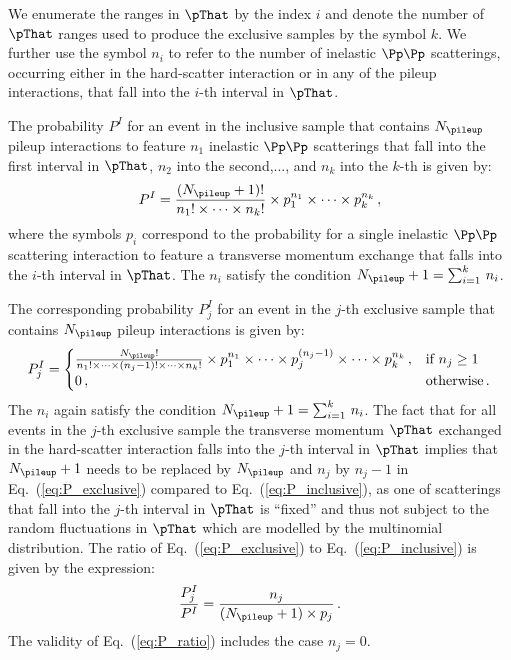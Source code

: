 We enumerate the ranges in $\pThat$ by the index $i$ and denote the number of $\pThat$ ranges used to produce the exclusive samples by the symbol $k$.
We further use the symbol $n_{i}$ to refer to the number of inelastic $\Pp\Pp$ scatterings,
occurring either in the hard-scatter interaction or in any of the pileup interactions,
that fall into the $i$-th interval in $\pThat$.

The probability $P^{I}$ for an event in the inclusive sample that contains $N_{\pileup}$ pileup interactions
to feature $n_{1}$ inelastic $\Pp\Pp$ scatterings that fall into the first interval in $\pThat$, $n_{2}$ into the second,$\dots$, and $n_{k}$ into the $k$-th 
is given by:
\begin{equation}
P^{I} = \frac{(N_{\pileup} + 1)!}{n_{1}! \times \dots \times n_{k}!} \times p_{1}^{n_{1}} \times \dots \times p_{k}^{n_{k}} \, ,
\label{eq:P_inclusive}
\end{equation}
where the symbols $p_{i}$ correspond to the probability for a single inelastic $\Pp\Pp$ scattering interaction to feature a transverse momentum exchange that falls into the $i$-th interval in $\pThat$.
The $n_{i}$ satisfy the condition $N_{\pileup} + 1 = \sum_{i=1}^{k} \, n_{i}$.

The corresponding probability $P_{j}^{I}$ for an event in the $j$-th exclusive sample that contains $N_{\pileup}$ pileup interactions is given by:
\begin{equation}
P_{j}^{I} = \begin{cases}
\frac{N_{\pileup}!}{n_{1}! \times \dots \times (n_{j} - 1)! \times \dots \times n_{k}!} \times p_{1}^{n_{1}} \times \dots \times p_{j}^{(n_{j} - 1)} \times \dots \times p_{k}^{n_{k}} \, ,
  & \text{if $n_{j} \geq 1$} \\
0 \, , & \text{otherwise} \, .
\end{cases}
\label{eq:P_exclusive}
\end{equation}
The $n_{i}$ again satisfy the condition $N_{\pileup} + 1 = \sum_{i=1}^{k} \, n_{i}$.
The fact that for all events in the $j$-th exclusive sample the transverse momentum $\pThat$ exchanged in the hard-scatter interaction falls into the $j$-th interval in $\pThat$
implies that $N_{\pileup} + 1$ needs to be replaced by $N_{\pileup}$ and $n_{j}$ by $n_{j} - 1$ in Eq.~(\ref{eq:P_exclusive}) compared to Eq.~(\ref{eq:P_inclusive}),
as one of scatterings that fall into the $j$-th interval in $\pThat$ is ``fixed'' and thus not subject to the random fluctuations in $\pThat$ which are modelled by the multinomial distribution.
The ratio of Eq.~(\ref{eq:P_exclusive}) to Eq.~(\ref{eq:P_inclusive}) is given by the expression:
\begin{equation}
\frac{P_{j}^{I}}{P^{I}} = \frac{n_{j}}{(N_{\pileup} + 1) \times p_{j}} \, .
\label{eq:P_ratio}
\end{equation}
The validity of Eq.~(\ref{eq:P_ratio}) includes the case $n_{j} = 0$.

